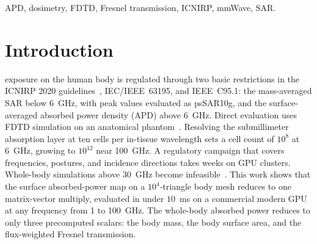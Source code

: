 \documentclass[journal,twocolumn,10pt]{IEEEtran}
\theoremstyle{plain}
\theoremstyle{remark}
\begin{document}
\begin{IEEEkeywords}
APD, dosimetry, FDTD, Fresnel transmission, ICNIRP, mmWave, SAR.
\end{IEEEkeywords}

\IEEEpeerreviewmaketitle



\section{Introduction}\label{sec:introduction}
 exposure on the human body is regulated
through two basic restrictions in the \gls{ICNIRP} 2020
guidelines~\cite{ICNIRP2020}, IEC/IEEE~63195, and IEEE~C95.1: the
mass-averaged \gls{SAR} below 6~GHz, with peak values evaluated as
\gls{psSAR10g}, and the surface-averaged absorbed power density
(\gls{APD}) above 6~GHz. Direct evaluation uses
\gls{FDTD} simulation on an anatomical
phantom~\cite{Kodera2024,Diao2024,Hirata2021,Wydaeghe2026}. Resolving the submillimeter
absorption layer at ten cells per in-tissue wavelength
sets a cell count of $10^{8}$ at 6~GHz, growing to $10^{12}$ near
100~GHz. A regulatory campaign that covers frequencies, postures, and
incidence directions takes weeks on \gls{GPU} clusters. Whole-body
simulations above 30~GHz become infeasible~\cite{Wydaeghe2026}.
This work shows that the surface absorbed-power map on a
$10^4$-triangle body mesh reduces to one matrix-vector multiply,
evaluated in under $10$~ms on a commercial modern GPU at any
frequency from 1 to 100~GHz. The whole-body absorbed power
reduces to only three precomputed scalars: the body mass, the
body surface area, and the flux-weighted Fresnel transmission.
\end{document}
